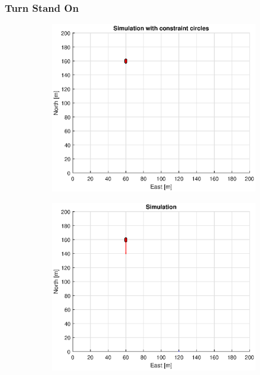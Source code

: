 \subsubsection{Turn Stand On}
\clearpage
\begin{figure}[!b] %
    \begin{subfigure}[b]{0.49\textwidth}
        \centering
        \includegraphics[width=\textwidth]{Images/Figures/sving_SO/Simple0_f1_Frame1}
    \end{subfigure}
    \hfill
    \begin{subfigure}[b]{0.499\textwidth}
        \centering
        \includegraphics[width=\textwidth]{Images/Figures/sving_SO/Simple0_f600_Frame1}

\end{subfigure}
\end{figure}
